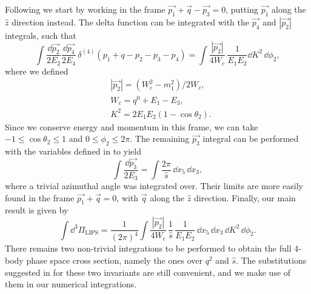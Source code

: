 Following \cite{Czyz1964} we start by working in the frame $\vec{p_1} + \vec{q} - \vec{p_3} = 0$, putting $\vec{p_1}$ along the $\hat{z}$ direction instead. The delta function can be integrated with the $\vec{p_4}$ and $|\vec{p_2}|$ integrals, such that 
%
\begin{equation}
 \int \frac{\dd \vec{p_2} }{2 E_2} \frac{\dd \vec{p_4}}{2 E_4} \, \delta^{(4)} (p_1 + q - p_2 - p_3 - p_4) =  \int \frac{ |\vec{p_2}|}{4 W_c} \, \frac{1}{E_1 E_2} \dd K^2 \, \dd \phi_2,
\end{equation}
%
where we defined
%
\begin{align}
&|\vec{p_2}| = (W_c^2 - m_1^2)/2W_c, \nonumber\\\nonumber &W_c = q^0 + E_1 - E_3, \\ &K^2 = 2 E_1 E_2 (1 - \cos{\theta_2}).
\end{align}
%
Since we conserve energy and momentum in this frame, we can take $-1 \leq \cos{\theta_2} \leq 1$ and $0 \leq \phi_2 \leq 2 \pi$. The remaining $\vec{p_3}$ integral can be performed with the variables defined in \cite{Czyz1964} to yield
%
\begin{equation}
 \int \frac{\dd \vec{p_3} }{2 E_3}  =  \int \frac{2 \pi}{\hat{s}} \, \dd x_5 \, \dd x_3,
\end{equation}
%
where a trivial azimuthal angle was integrated over. Their limits are more easily found in the frame $\vec{p_1} + \vec{q} = 0$, with $\vec{q}$ along the $\hat{z}$ direction. Finally, our main result is given by
%
\begin{equation}
\int \dd^3 \Pi_{\mathrm{LIPS}} = \frac{1}{(2\pi)^4} \int \frac{|\vec{p_2}|}{4 W_c} \, \frac{1}{\hat{s}} \, \frac{1}{E_1 E_2} \, \dd x_5 \, \dd x_3 \, \dd K^2 \, \dd \phi_2 .
\end{equation}
%
There remains two non-trivial integrations to be performed to obtain the full 4-body phase space cross section, namely the ones over $q^2$ and $\hat{s}$. The substitutions suggested in \cite{Lovseth1971} for these two invariants are still convenient, and we make use of them in our numerical integrations.
